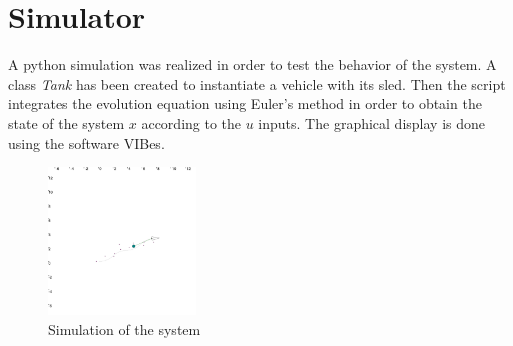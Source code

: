 \section*{Simulator}
    A python simulation was realized in order to test the behavior of the system. A class \textit{Tank} has been created to instantiate a vehicle with its sled. Then the script integrates the evolution equation using Euler's method in order to obtain the state of the system $x$ according to the $u$ inputs. The graphical display is done using the software VIBes.

    \begin{figure}[!htb]
        \centering
        \includegraphics[width=0.35\textwidth]{imgs/simulator.png}
        \caption{\label{fig:simulation} Simulation of the system}
    \end{figure}